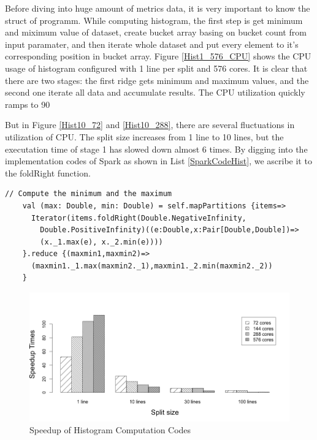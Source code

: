Before diving into huge amount of metrics data, it is very important to know the struct of programm. While computing histogram, the first step is get minimum and miximum value of dataset, create bucket array basing on bucket count from input paramater, and then iterate whole dataset and put every element to it's corresponding position in bucket array. Figure \ref{Hist1_576_CPU} shows the CPU usage of histogram configured with 1 line per split and 576 cores. It is clear that there are two stages: the first ridge gets minimum and maximum values, and the second one iterate all data and accumulate results. The CPU utilization quickly ramps to 90%

But in Figure \ref{Hist10_72} and \ref{Hist10_288}, there are several fluctuations in utilization of CPU. The split size increases from 1 line to 10 lines, but the executation time of stage 1 has slowed down almost 6 times. By digging into the implementation codes of Spark as shown in List \ref{SparkCodeHist}, we ascribe it to the foldRight function. 

\lstset{language=Java,frame=single}
\begin{lstlisting}[float,caption= Codes Snippet of Histogram in Spark , label=SparkCodeHist]
    // Compute the minimum and the maximum
    val (max: Double, min: Double) = self.mapPartitions {items=>
      Iterator(items.foldRight(Double.NegativeInfinity,
        Double.PositiveInfinity)((e:Double,x:Pair[Double,Double])=>
        (x._1.max(e), x._2.min(e))))
    }.reduce {(maxmin1,maxmin2)=>
      (maxmin1._1.max(maxmin2._1),maxmin1._2.min(maxmin2._2))
    }
\end{lstlisting}


\begin{figure}[h]
\includegraphics[scale=.50]{figures/HistSpeedup.png}
\caption{Speedup of Histogram Computation Codes}
\label{HistSpeedup}
\end{figure}

